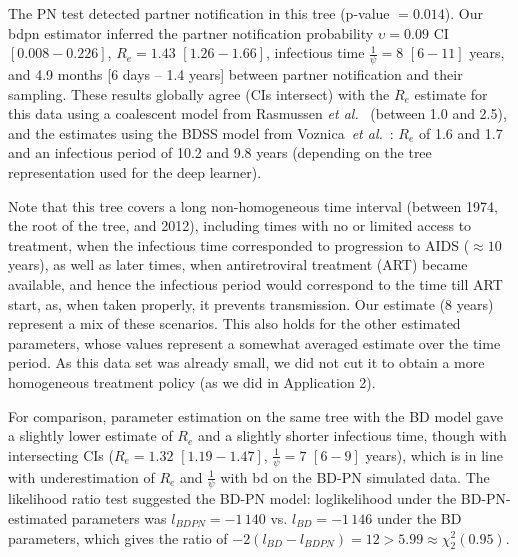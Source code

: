 \documentclass[10pt,letterpaper]{article}
\begin{document}
The PN test detected partner notification in this tree (p-value $=0.014$). Our bdpn estimator inferred the partner notification probability $\upsilon=0.09$ CI $[0.008-0.226]$,  
$R_e = 1.43$ $[1.26-1.66]$, infectious time $\frac{1}{\psi} = 8$ $[6-11]$ years, and 4.9 months [6 days -- 1.4 years] between partner notification and their sampling. These results globally agree (CIs intersect) with the $R_e$ estimate for this data using a coalescent model from Rasmussen \textit{et al.}~\cite{Rasmussen2017} (between 1.0 and 2.5), and the estimates using the BDSS model from Voznica~\textit{et al.}~\cite{Voznica2021}: $R_e$ of 1.6 and 1.7 and an infectious period of 10.2 and 9.8 years (depending on the tree representation used for the deep learner).

Note that this tree covers a long non-homogeneous time interval (between 1974, the root of the tree, and 2012), including times with no or limited access to treatment, when the infectious time corresponded to progression to AIDS ($\approx 10$ years), as well as later times, when antiretroviral treatment (ART) became available, and hence the infectious period would correspond to the time till ART start, as, when taken properly, it prevents transmission. Our estimate (8 years) represent a mix of these scenarios. This also holds for the other estimated parameters, whose values represent a somewhat averaged estimate over the time period. As this data set was already small, we did not cut it to obtain a more homogeneous treatment policy (as we did in Application 2).


For comparison, parameter estimation on the same tree with the BD model gave a slightly lower estimate of $R_e$ and a slightly shorter infectious time, though with intersecting CIs ($R_e = 1.32$ $[1.19-1.47]$, $\frac{1}{\psi} = 7$ $[6-9]$ years), which is in line with underestimation of $R_e$ and $\frac{1}{\psi}$ with bd on the BD-PN simulated data. The likelihood ratio test suggested the BD-PN model: loglikelihood under the BD-PN-estimated parameters was $l_{BDPN} = -1\,140$ vs. $l_{BD}=-1\,146$ under the BD parameters, which gives the ratio of $-2 (l_{BD} - l_{BDPN}) =	12 > 5.99 \approx \chi^2_2(0.95)$. %
\end{document}
